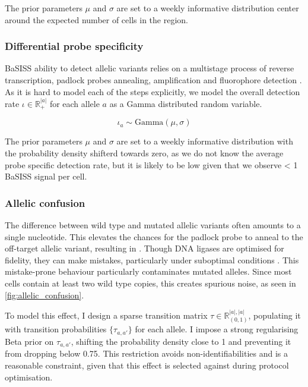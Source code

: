 The prior parameters $\mu$ and $\sigma$ are set to a weekly informative distribution center around the expected number of cells in the region.

\subsubsection*{Differential probe specificity}

\ac{BaSISS} ability to detect allelic variants relies on a multistage process of reverse transcription, padlock probes annealing, amplification and fluorophore detection \parencite{Svedlund2019-xb}. As it is hard to model each of the steps explicitly, we model the overall detection rate $\iota \in \mathbb{R}^{|a|}_{+}$ for each allele $a$ as a Gamma distributed random variable.

\begin{equation}
    {\iota}_{a} \sim \text{Gamma}(\mu, \sigma)
\end{equation}

The prior parameters $\mu$ and $\sigma$ are set to a weekly informative distribution with the probability density shifterd towards zero, as we do not know the average probe specific detection rate, but it is likely to be low given that we observe < 1 \ac{BaSISS} signal per cell.

\subsubsection*{Allelic confusion}

The difference between wild type and mutated allelic variants often amounts to a single nucleotide. This elevates the chances for the padlock probe to anneal to the off-target allelic variant, resulting in . Though DNA ligases are optimised for fidelity, they can make mistakes, particularly under suboptimal conditions \parencite{Lohman2016-ec}. This mistake-prone behaviour particularly contaminates mutated alleles. Since most cells contain at least two wild type copies, this creates spurious noise, as seen in \cref{fig:allelic_confusion}.

To model this effect, I design a sparse transition matrix ${\tau} \in \mathbb{R}^{|a|, |a|}_{(0,1)} $, populating it with transition probabilities $ \{ {\tau}_{a,a'}\} $ for each allele. I impose a strong regularising Beta prior on $ \tau_{a,a'} $, shifting the probability density close to 1 and preventing it from dropping below 0.75. This restriction avoids non-identifiabilities and is a reasonable constraint, given that this effect is selected against during protocol optimisation.

